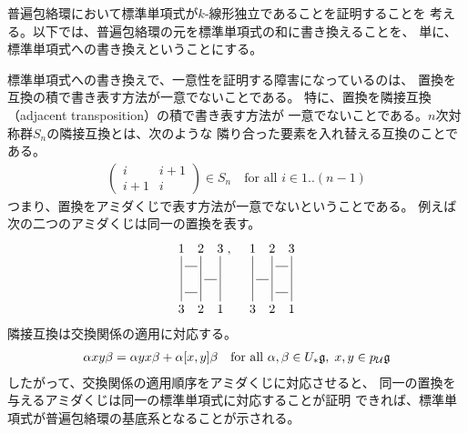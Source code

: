 {	普遍包絡環において標準単項式が$k$-線形独立であることを証明することを
	考える。以下では、普遍包絡環の元を標準単項式の和に書き換えることを、
	単に、標準単項式への書き換えということにする。
	
	\begin{observation}[交換関係とアミダくじ]
	\label{obs:交換関係とアミダくじ} %
		標準単項式への書き換えで、一意性を証明する障害になっているのは、
		置換を互換の積で書き表す方法が一意でないことである。
		特に、置換を隣接互換（adjacent transposition）の積で書き表す方法が
		一意でないことである。$n$次対称群$S_n$の隣接互換とは、次のような
		隣り合った要素を入れ替える互換のことである。
		\begin{equation*}\begin{split}
			\begin{pmatrix}
				i & i + 1 \\ i + 1 & i
			\end{pmatrix}\in S_n \quad\text{for all } i\in 1..(n-1)
		\end{split}\end{equation*}
		つまり、置換をアミダくじで表す方法が一意でないということである。
		例えば次の二つのアミダくじは同一の置換を表す。
		\begin{equation*}\begin{split}
			\xymatrix@R=1ex@C=1ex{
				1 \ar@{-}[dddd] & 2 \ar@{-}[dddd] & 3 \ar@{-}[dddd] \\
				\ar@{-}[r] & \\
				& \ar@{-}[r] & \\
				\ar@{-}[r] & \\
				3 & 2 & 1 \\
			},\quad \xymatrix@R=1ex@C=1ex{
				1 \ar@{-}[dddd] & 2 \ar@{-}[dddd] & 3 \ar@{-}[dddd] \\
				& \ar@{-}[r] & \\
				\ar@{-}[r] & \\
				& \ar@{-}[r] & \\
				3 & 2 & 1 \\
			}
		\end{split}\end{equation*}
		隣接互換は交換関係の適用に対応する。
		\begin{equation*}\begin{split}
			\alpha xy\beta = \alpha yx\beta + \alpha[x,y]\beta
			\quad\text{for all } \alpha,\beta\in U_*{\mathfrak{g}},\; x,y\in p_{{\mathcal{U}}}{\mathfrak{g}}
		\end{split}\end{equation*}
		したがって、交換関係の適用順序をアミダくじに対応させると、
		同一の置換を与えるアミダくじは同一の標準単項式に対応することが証明
		できれば、標準単項式が普遍包絡環の基底系となることが示される。
	\end{observation} %

}
